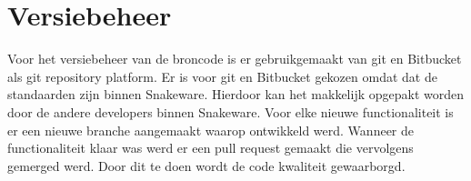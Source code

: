\section{Versiebeheer}
Voor het versiebeheer van de broncode is er gebruikgemaakt van git en Bitbucket als git repository platform. 
Er is voor git en Bitbucket gekozen omdat dat de standaarden zijn binnen Snakeware.
Hierdoor kan het makkelijk opgepakt worden door de andere developers binnen Snakeware.
Voor elke nieuwe functionaliteit is er een nieuwe branche aangemaakt waarop ontwikkeld werd.
Wanneer de functionaliteit klaar was werd er een pull request gemaakt die vervolgens gemerged werd.
Door dit te doen wordt de code kwaliteit gewaarborgd.
